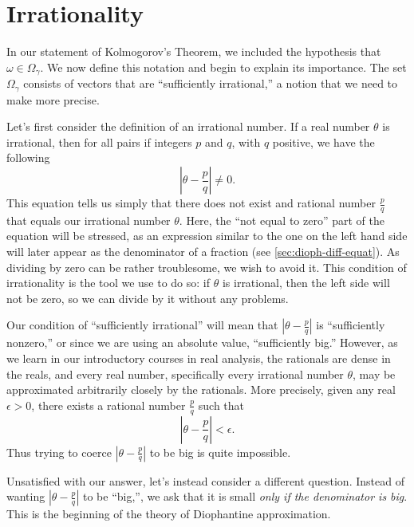 \documentclass[twoside,letterpaper,11pt]{article}
\numberwithin{equation}{section}
\begin{document}
\section{Irrationality}
\label{sec:irrationality}

In our statement of Kolmogorov's Theorem, we included the hypothesis that
$\omega \in \Omega_{\gamma}$.
We now define this notation and begin to explain its importance.
The set $\Omega_{\gamma}$ consists of vectors that are ``sufficiently
irrational,'' a notion that we need to make more precise.

Let's first consider the definition of an irrational number.
If a real number $\theta$ is irrational, then for all pairs if integers $p$ and
$q$, with $q$ positive, we have the following
\begin{equation*}
  \left| \theta - \frac{p}{q} \right| \neq 0.
\end{equation*}
This equation tells us simply that there does not exist and rational number
$\frac{p}{q}$ that equals our irrational number $\theta$.
Here, the ``not equal to zero'' part of the equation will be stressed, as an
expression similar to the one on the left hand side will later appear as the
denominator of a fraction (see \cref{sec:dioph-diff-equat}).
As dividing by zero can be rather troublesome, we wish to avoid it.
This condition of irrationality is the tool we use to do so: if $\theta$ is
irrational, then the left side will not be zero, so we can divide by it without
any problems.

Our condition of ``sufficiently irrational'' will mean that $\left| \theta -
  \frac{p}{q} \right|$ is ``sufficiently nonzero,'' or since we are using an
absolute value, ``sufficiently big.''
However, as we learn in our introductory courses in real analysis, the rationals
are dense in the reals, and every real number, specifically every irrational
number $\theta$, may be approximated arbitrarily closely by the rationals.
More precisely, given any real $\epsilon > 0$, there exists a rational number
$\frac{p}{q}$ such that
\begin{equation*}
  \left| \theta - \frac{p}{q} \right| < \epsilon.
\end{equation*}
Thus trying to coerce $\left| \theta - \frac{p}{q} \right|$ to be big is quite
impossible.

Unsatisfied with our answer, let's instead consider a different question.
Instead of wanting $\left| \theta - \frac{p}{q} \right|$ to be ``big,'', we ask
that it is small \emph{only if the denominator is big}.
This is the beginning of the theory of Diophantine approximation.
\end{document}
